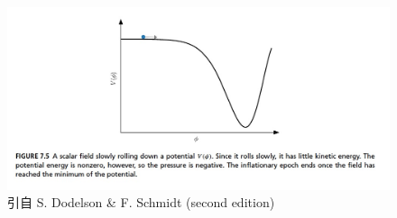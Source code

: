 \documentclass[]{ctexart}
\begin{document}
\begin{figure}[!hbtp]
	\centering
	\includegraphics[width=1.0\linewidth]{slow-roll.jpg}
	\caption{引自 S. Dodelson \& F. Schmidt (second edition)} \label{slow-roll}
\end{figure}
\end{document}
